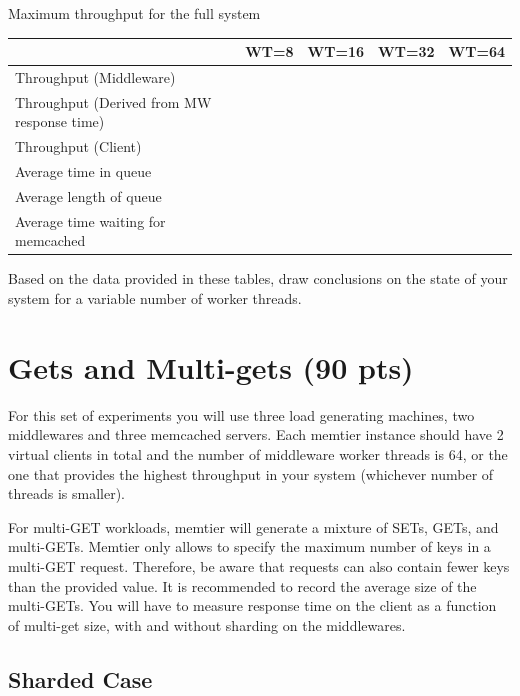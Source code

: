 \documentclass[11pt,a4paper]{article}
\begin{document}
\begin{center}
	{Maximum throughput for the full system}
	\begin{tabular}{|l|p{1.5cm}|p{1.5cm}|p{1.5cm}|p{1.5cm}|}
		\hline                                            & WT=8 & WT=16 & WT=32 & WT=64 \\ 
		\hline Throughput (Middleware)                    &      &       &       &       \\ 
		\hline Throughput (Derived from MW response time) &      &       &       &       \\ 
		\hline Throughput (Client)                        &      &       &       &       \\ 
		\hline Average time in queue                      &      &       &       &       \\ 
		\hline Average length of queue                    &      &       &       &       \\ 
		\hline Average time waiting for memcached         &      &       &       &       \\ 
		\hline 
	\end{tabular}
\end{center}

Based on the data provided in these tables, draw conclusions on the state of your system for a variable number of worker threads.

\section{Gets and Multi-gets (90 pts)}

For this set of experiments you will use three load generating machines, two middlewares and three memcached servers. Each memtier instance should have 2 virtual clients in total and the number of middleware worker threads is 64, or the one that provides the highest throughput in your system (whichever number of threads is smaller).

For multi-GET workloads, memtier will generate a mixture of SETs, GETs, and multi-GETs. Memtier only allows to specify the maximum number of keys in a multi-GET request. Therefore, be aware that requests can also contain fewer keys than the provided value. It is recommended to record the average size of the multi-GETs. You will have to measure response time on the client as a function of multi-get size, with and without sharding on the middlewares.

\subsection{Sharded Case}
\end{document}
